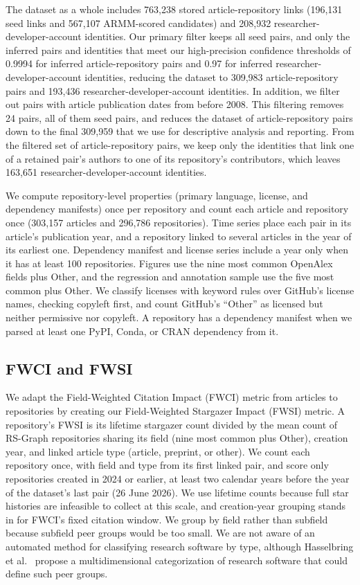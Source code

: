 \documentclass[pdflatex,sn-nature]{sn-jnl}%
\begin{document}
The dataset as a whole includes 763,238 stored article-repository links (196,131 seed links and 567,107 ARMM-scored candidates) and 208,932 researcher-developer-account identities.
Our primary filter keeps all seed pairs, and only the inferred pairs and identities that meet our high-precision confidence thresholds of 0.9994 for inferred article-repository pairs and 0.97 for inferred researcher-developer-account identities, reducing the dataset to 309,983 article-repository pairs and 193,436 researcher-developer-account identities.
In addition, we filter out pairs with article publication dates from before 2008.
This filtering removes 24 pairs, all of them seed pairs, and reduces the dataset of article-repository pairs down to the final 309,959 that we use for descriptive analysis and reporting.
From the filtered set of article-repository pairs, we keep only the identities that link one of a retained pair's authors to one of its repository's contributors, which leaves 163,651 researcher-developer-account identities.

We compute repository-level properties (primary language, license, and dependency manifests) once per repository and count each article and repository once (303,157 articles and 296,786 repositories).
Time series place each pair in its article's publication year, and a repository linked to several articles in the year of its earliest one.
Dependency manifest and license series include a year only when it has at least 100 repositories.
Figures use the nine most common OpenAlex fields plus Other, and the regression and annotation sample use the five most common plus Other.
We classify licenses with keyword rules over GitHub's license names, checking copyleft first, and count GitHub's ``Other'' as licensed but neither permissive nor copyleft.
A repository has a dependency manifest when we parsed at least one PyPI, Conda, or CRAN dependency from it.

\subsection{FWCI and FWSI}\label{subsec:m-fwsi}

We adapt the Field-Weighted Citation Impact (FWCI) metric from articles to repositories by creating our Field-Weighted Stargazer Impact (FWSI) metric.
A repository's FWSI is its lifetime stargazer count divided by the mean count of RS-Graph repositories sharing its field (nine most common plus Other), creation year, and linked article type (article, preprint, or other).
We count each repository once, with field and type from its first linked pair, and score only repositories created in 2024 or earlier, at least two calendar years before the year of the dataset's last pair (26 June 2026).
We use lifetime counts because full star histories are infeasible to collect at this scale, and creation-year grouping stands in for FWCI's fixed citation window.
We group by field rather than subfield because subfield peer groups would be too small.
We are not aware of an automated method for classifying research software by type, although Hasselbring et al.~\cite{hasselbring2025multi} propose a multidimensional categorization of research software that could define such peer groups.
\end{document}
